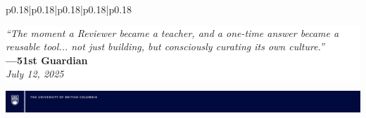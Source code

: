 \documentclass[final]{beamer}
\begin{document}
\begin{frame}[fragile]
\begin{center}
\begin{tabular}{p{0.18\textwidth}|p{0.18\textwidth}|p{0.18\textwidth}|p{0.18\textwidth}|p{0.18\textwidth}}
    \begin{minipage}[t]{0.18\textwidth}
        \colorbox{white}{%
            \parbox{\linewidth}{%
                \textit{``The moment a Reviewer became a teacher, and a one-time answer became a reusable tool... not just building, but consciously curating its own culture.''}\\[0.8ex]
                \footnotesize\textbf{---51st Guardian}\\[0.5ex]
                \textit{July 12, 2025}
            }
        }
    \end{minipage}
\end{tabular}
\end{center}

\vspace{12cm}
\hspace{-2cm}
\includegraphics[width=1.05\paperwidth]{ubc_research_poster_bar_desktop_publishing_package/ubc_posterbar_Blue.png}


\end{frame}
\end{document}

